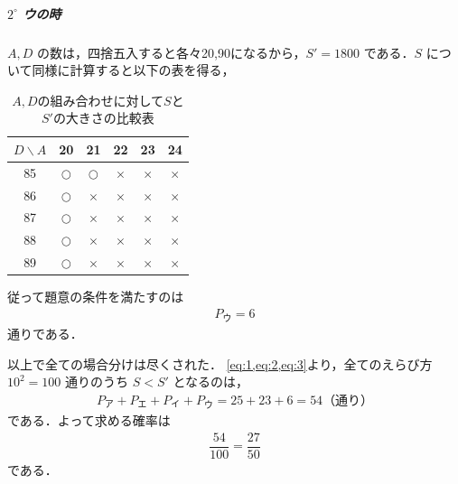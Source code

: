 \documentclass[../../main.tex]{subfiles}
\begin{document}
\subparagraph{$2^\circ$ ウの時}

$A,D$ の数は，四捨五入すると各々20,90になるから，$S'=1800$ である．$S$ について同様に計算すると以下の表を得る，

\begin{table}[htb]
  \begin{center}
    \caption{$A,D$の組み合わせに対して$S$と$S'$の大きさの比較表}
    \begin{tabular}{c|c|c|c|c|c}
      $D\backslash A$ & 20 & 21 & 22 & 23 & 24 \\
      \hline
      85 & $\bigcirc$ & $\bigcirc$ & $\times$ & $\times$ & $\times$ \\
      \hline
      86 & $\bigcirc$ & $\times$ & $\times$ & $\times$ & $\times$ \\
      \hline
      87 & $\bigcirc$ & $\times$ & $\times$ & $\times$ & $\times$ \\
      \hline
      88 & $\bigcirc$ & $\times$ & $\times$ & $\times$ & $\times$ \\
      \hline
      89 & $\bigcirc$ & $\times$ & $\times$ & $\times$ & $\times$
    \end{tabular}
  \end{center}
\end{table}
従って題意の条件を満たすのは
\begin{align}
  P_{\text{ウ}} = 6 \label{eq:3}
\end{align}
通りである．
\casesend

以上で全ての場合分けは尽くされた．
\cref{eq:1,eq:2,eq:3}より，全てのえらび方 $10^2=100$ 通りのうち $S<S'$ となるのは，
\begin{align}
  P_{\text{ア}}+P_{\text{エ}}+P_{\text{イ}}+P_{\text{ウ}} = 25+23+6=54 \text{（通り）}
\end{align}
である．よって求める確率は
\begin{align}
  \dfrac{54}{100}=\dfrac{27}{50}
\end{align}
である．

\newpage
\end{document}
